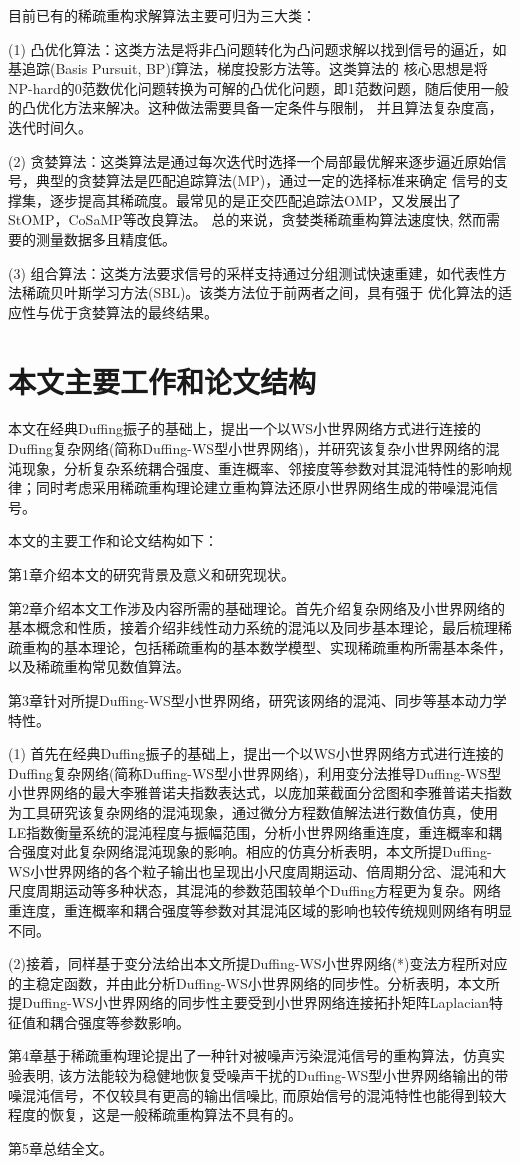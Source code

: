 目前已有的稀疏重构求解算法主要可归为三大类： 

(1)	凸优化算法：这类方法是将非凸问题转化为凸问题求解以找到信号的逼近，如基追踪(Basis Pursuit, BP)f算法，梯度投影方法等。这类算法的
核心思想是将NP-hard的0范数优化问题转换为可解的凸优化问题，即1范数问题，随后使用一般的凸优化方法来解决。这种做法需要具备一定条件与限制，
并且算法复杂度高，迭代时间久。

(2)	贪婪算法：这类算法是通过每次迭代时选择一个局部最优解来逐步逼近原始信号，典型的贪婪算法是匹配追踪算法(MP)，通过一定的选择标准来确定
信号的支撑集，逐步提高其稀疏度。最常见的是正交匹配追踪法OMP，又发展出了StOMP，CoSaMP等改良算法。
总的来说，贪婪类稀疏重构算法速度快, 然而需要的测量数据多且精度低。

(3)	组合算法：这类方法要求信号的采样支持通过分组测试快速重建，如代表性方法稀疏贝叶斯学习方法(SBL)。该类方法位于前两者之间，具有强于
优化算法的适应性与优于贪婪算法的最终结果。
\section{本文主要工作和论文结构}
本文在经典Duffing振子的基础上，提出一个以WS小世界网络方式进行连接的Duffing复杂网络(简称Duffing-WS型小世界网络)，并研究该复杂小世界网络的混沌现象，分析复杂系统耦合强度、重连概率、邻接度等参数对其混沌特性的影响规律；同时考虑采用稀疏重构理论建立重构算法还原小世界网络生成的带噪混沌信号。

本文的主要工作和论文结构如下：

第1章介绍本文的研究背景及意义和研究现状。

第2章介绍本文工作涉及内容所需的基础理论。首先介绍复杂网络及小世界网络的基本概念和性质，接着介绍非线性动力系统的混沌以及同步基本理论，最后梳理稀疏重构的基本理论，包括稀疏重构的基本数学模型、实现稀疏重构所需基本条件，以及稀疏重构常见数值算法。

第3章针对所提Duffing-WS型小世界网络，研究该网络的混沌、同步等基本动力学特性。

(1) 首先在经典Duffing振子的基础上，提出一个以WS小世界网络方式进行连接的Duffing复杂网络(简称Duffing-WS型小世界网络)，利用变分法推导Duffing-WS型小世界网络的最大李雅普诺夫指数表达式，以庞加莱截面分岔图和李雅普诺夫指数为工具研究该复杂网络的混沌现象，通过微分方程数值解法进行数值仿真，使用LE指数衡量系统的混沌程度与振幅范围，分析小世界网络重连度，重连概率和耦合强度对此复杂网络混沌现象的影响。相应的仿真分析表明，本文所提Duffing-WS小世界网络的各个粒子输出也呈现出小尺度周期运动、倍周期分岔、混沌和大尺度周期运动等多种状态，其混沌的参数范围较单个Duffing方程更为复杂。网络重连度，重连概率和耦合强度等参数对其混沌区域的影响也较传统规则网络有明显不同。

(2)接着，同样基于变分法给出本文所提Duffing-WS小世界网络(*)变法方程所对应的主稳定函数，并由此分析Duffing-WS小世界网络的同步性。分析表明，本文所提Duffing-WS小世界网络的同步性主要受到小世界网络连接拓扑矩阵Laplacian特征值和耦合强度等参数影响。

第4章基于稀疏重构理论提出了一种针对被噪声污染混沌信号的重构算法，仿真实验表明, 该方法能较为稳健地恢复受噪声干扰的Duffing-WS型小世界网络输出的带噪混沌信号，不仅较具有更高的输出信噪比, 而原始信号的混沌特性也能得到较大程度的恢复，这是一般稀疏重构算法不具有的。

第5章总结全文。